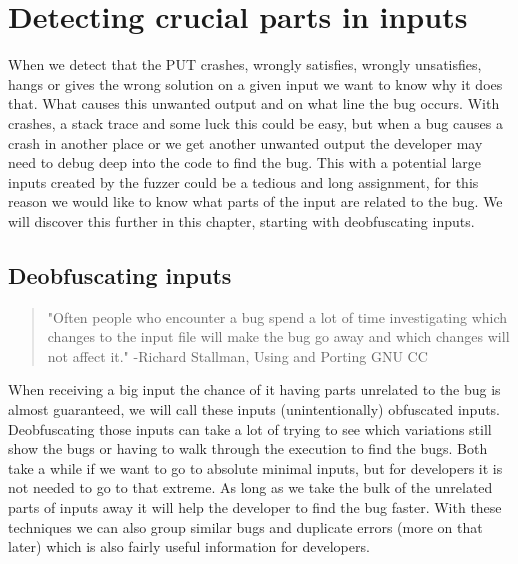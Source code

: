 \chapter{Detecting crucial parts in inputs}
\label{cha:3:intro}
When we detect that the PUT crashes, wrongly satisfies, wrongly unsatisfies, hangs or gives the wrong solution on a given input we want to know why it does that. What causes this unwanted output and on what line the bug occurs. With crashes, a stack trace and some luck this could be easy, but when a bug causes a crash in another place or we get another unwanted output the developer may need to debug deep into the code to find the bug. This with a potential large inputs created by the fuzzer could be a tedious and long assignment, for this reason we would like to know what parts of the input are related to the bug. We will discover this further in this chapter, starting with deobfuscating inputs.

\section{Deobfuscating inputs}
\label{cha:3:Deobfuscating}
\begin{quote}
	"Often people who encounter a bug spend a lot of time investigating which changes to the input file will make the bug go away and which changes will not affect it." \cite{50akgun2018metamorphic}
	\newline
	-Richard Stallman,	Using and Porting GNU CC
\end{quote} 
When receiving a big input the chance of it having parts unrelated to the bug is almost guaranteed, we will call these inputs (unintentionally) obfuscated inputs. Deobfuscating those inputs can take a lot of trying to see which variations still show the bugs or having to walk through the execution to find the bugs. Both take a while if we want to go to absolute minimal inputs, but for developers it is not needed to go to that extreme. As long as we take the bulk of the unrelated parts of inputs away it will help the developer to find the bug faster. With these techniques we can also group similar bugs and duplicate errors (more on that later) which is also fairly useful information for developers.
